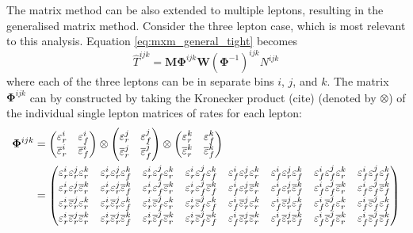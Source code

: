 The matrix method can be also extended to multiple leptons,
resulting in the generalised matrix method. 
Consider the three lepton case, which is most relevant to this
analysis. 
Equation \eqref{eq:mxm_general_tight} becomes
\begin{equation}
\hat{T}^{ijk} = \mathbf{M}\mathbf{\Phi}^{ijk}\mathbf{W}(\mathbf{\Phi}^{-1})^{ijk} N^{ijk}
\end{equation}
where each of the three leptons can be in separate bins $i$, $j$, and $k$.
The matrix $\mathbf{\Phi}^{ijk}$
can by constructed by taking the Kronecker product (cite) (denoted by $\otimes$)
of the individual single lepton matrices of rates for each lepton:
\begin{align}
  \mathbf{\Phi}^{ijk} &=
  \begin{pmatrix}
  \real^i & \fake^i \\ \realbar^i & \fakebar^i
  \end{pmatrix} 
  \otimes
  \begin{pmatrix}
  \real^j & \fake^j \\ \realbar^j & \fakebar^j
  \end{pmatrix} 
  \otimes
  \begin{pmatrix}
  \real^k & \fake^k \\ \realbar^k & \fakebar^k
  \end{pmatrix} \\
  &=
  \begin{pmatrix} 
  \real^i\real^j\real^k  &
  \real^i\real^j\fake^k  &
  \real^i\fake^j\real^k  &
  \real^i\fake^j\fake^k  &
  \fake^i\real^j\real^k  &
  \fake^i\real^j\fake^k  &
  \fake^i\fake^j\real^k  &
  \fake^i\fake^j\fake^k  \\
  \real^i\real^j\realbar^k  &
  \real^i\real^j\fakebar^k  &
  \real^i\fake^j\realbar^k  &
  \real^i\fake^j\fakebar^k  &
  \fake^i\real^j\realbar^k  &
  \fake^i\real^j\fakebar^k  &
  \fake^i\fake^j\realbar^k  &
  \fake^i\fake^j\fakebar^k  \\
  \real^i\realbar^j\real^k  &
  \real^i\realbar^j\fake^k  &
  \real^i\fakebar^j\real^k  &
  \real^i\fakebar^j\fake^k  &
  \fake^i\realbar^j\real^k  &
  \fake^i\realbar^j\fake^k  &
  \fake^i\fakebar^j\real^k  &
  \fake^i\fakebar^j\fake^k  \\
  \real^i\realbar^j\realbar^k  &
  \real^i\realbar^j\fakebar^k  &
  \real^i\fakebar^j\realbar^k  &
  \real^i\fakebar^j\fakebar^k  &
  \fake^i\realbar^j\realbar^k  &
  \fake^i\realbar^j\fakebar^k  &
  \fake^i\fakebar^j\realbar^k  &
  \fake^i\fakebar^j\fakebar^k  \\

\end{pmatrix}
\end{align}
